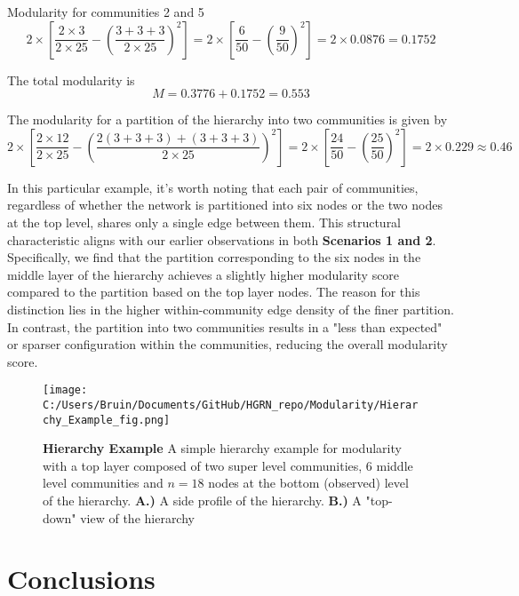\documentclass[a4paper,12pt]{article}
\begin{document}
	Modularity for communities 2 and 5
	\[ 2\times \left[\frac{2\times 3}{2\times 25}-\left(\frac{3+3+3}{2\times 25}\right)^2\right] =  2\times \left[\frac{6}{50}-\left(\frac{9}{50}\right)^2\right] = 2\times 0.0876 = 0.1752\]
	
	The total modularity is 
	\[M = 0.3776 + 0.1752 = 0.553 \]
	
	The modularity for a partition of the hierarchy into two communities is given by 
	\[ 2\times \left[\frac{2\times 12}{2\times 25}-\left(\frac{2(3+3+3)+(3+3+3)}{2\times 25}\right)^2\right] =  2\times \left[\frac{24}{50}-\left(\frac{25}{50}\right)^2\right] = 2\times 0.229 \approx 0.46\]
	
	In this particular example, it's worth noting that each pair of communities, regardless of whether the network is partitioned into six nodes or the two nodes at the top level, shares only a single edge between them. This structural characteristic aligns with our earlier observations in both \textbf{Scenarios 1 and 2}. Specifically, we find that the partition corresponding to the six nodes in the middle layer of the hierarchy achieves a slightly higher modularity score compared to the partition based on the top layer nodes. The reason for this distinction lies in the higher within-community edge density of the finer partition. In contrast, the partition into two communities results in a "less than expected" or sparser configuration within the communities, reducing the overall modularity score.
	
	\begin{figure}[H]
		\caption{\textbf{Hierarchy Example} A simple hierarchy example for modularity with a top layer composed of two super level communities, 6 middle level communities and $n = 18$ nodes at the bottom (observed) level of the hierarchy. \textbf{A.)} A side profile of the hierarchy. \textbf{B.)} A "top-down" view of the hierarchy}
		\texttt{[image: C:/Users/Bruin/Documents/GitHub/HGRN\_repo/Modularity/Hierarchy\_Example\_fig.png]}
		\label{fig:hierarchy_example}
	\end{figure}
	
	\section{Conclusions}
	
	
	
	
	
	
	
	
	
	
	
\end{document}
